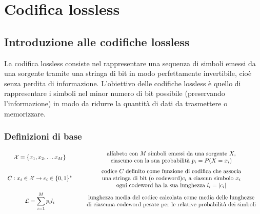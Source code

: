 \section{Codifica lossless}
\subsection{Introduzione alle codifiche lossless}
La codifica lossless consiste nel rappresentare una sequenza di simboli emessi da una sorgente tramite una stringa di bit
in modo perfettamente invertibile, cioè senza perdita di informazione. L'obiettivo delle codifiche lossless è quello di
rappresentare i simboli nel minor numero di bit possibile (preservando l'informazione) in modo da ridurre la quantità di
dati da trasmettere o memorizzare.

\subsubsection*{Definizioni di base}
\[\begin{array}{c c}
	\displaystyle \mathcal{X} = \left\{ x_1, x_2, \dots x_M \right\}
	& \quad \begin{array}{c}
		\text{alfabeto con } M \text{ simboli emessi da una sorgente } X, \\
		\text{ciascuno con la sua probabilità } p_i = P(X=x_i)
	\end{array}
	\\[12pt]

	\displaystyle C : x_i \in \mathcal{X} \to c_i \in \{0,1\}^*
	& \quad \begin{array}{c}
		\text{codice } C \text{ definito come funzione di codifica che associa} \\
		\text{una stringa di bit (o codeword)} c_i \text{ a ciascun simbolo } x_i \\
		\text{ogni codeword ha la sua lunghezza } l_i = |c_i|
	\end{array}
	\\[17pt]

	\displaystyle \mathcal{L} = \sum_{i=1}^{M} p_i l_i
	& \quad \begin{array}{c}
		\text{lunghezza media del codice calcolata come media delle lunghezze} \\
		\text{di ciascuna codeword pesate per le relative probabilità dei simboli}
	\end{array}
\end{array}\]

